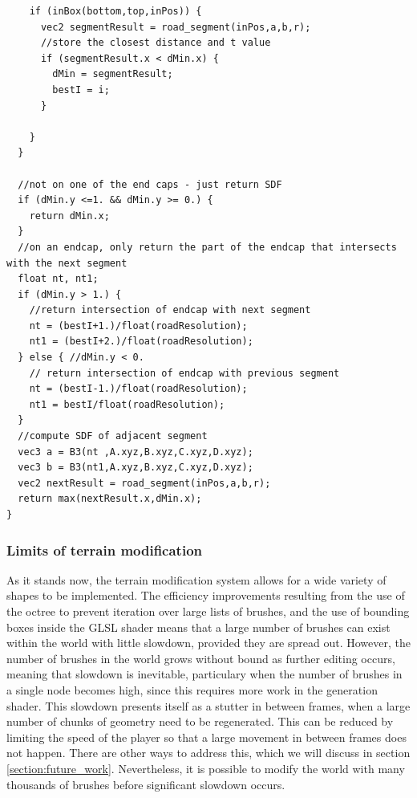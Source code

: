 \documentclass{article}
\begin{document}
\begin{lstlisting}
    if (inBox(bottom,top,inPos)) {
      vec2 segmentResult = road_segment(inPos,a,b,r);
      //store the closest distance and t value
      if (segmentResult.x < dMin.x) {
        dMin = segmentResult;
        bestI = i;
      }

    }
  }
    
  //not on one of the end caps - just return SDF
  if (dMin.y <=1. && dMin.y >= 0.) {
    return dMin.x;
  }
  //on an endcap, only return the part of the endcap that intersects with the next segment
  float nt, nt1;
  if (dMin.y > 1.) {
    //return intersection of endcap with next segment
    nt = (bestI+1.)/float(roadResolution);
    nt1 = (bestI+2.)/float(roadResolution);
  } else { //dMin.y < 0.
    // return intersection of endcap with previous segment
    nt = (bestI-1.)/float(roadResolution);
    nt1 = bestI/float(roadResolution);
  }
  //compute SDF of adjacent segment
  vec3 a = B3(nt ,A.xyz,B.xyz,C.xyz,D.xyz);
  vec3 b = B3(nt1,A.xyz,B.xyz,C.xyz,D.xyz);
  vec2 nextResult = road_segment(inPos,a,b,r);
  return max(nextResult.x,dMin.x);
}
\end{lstlisting}


\subsubsection{Limits of terrain modification}
\label{edit_limits}
As it stands now, the terrain modification system allows for a wide variety of shapes to be implemented. The efficiency improvements resulting from the use of the octree to prevent iteration over large lists of brushes, and the use of bounding boxes inside the GLSL shader means that a large number of brushes can exist within the world with little slowdown, provided they are spread out. However, the number of brushes in the world grows without bound as further editing occurs, meaning that slowdown is inevitable, particulary when the number of brushes in a single node becomes high, since this requires more work in the generation shader. This slowdown presents itself as a stutter in between frames, when a large number of chunks of geometry need to be regenerated. This can be reduced by limiting the speed of the player so that a large movement in between frames does not happen. There are other ways to address this, which we will discuss in section \ref{section:future_work}. Nevertheless, it is possible to modify the world with many thousands of brushes before significant slowdown occurs.
\end{document}
